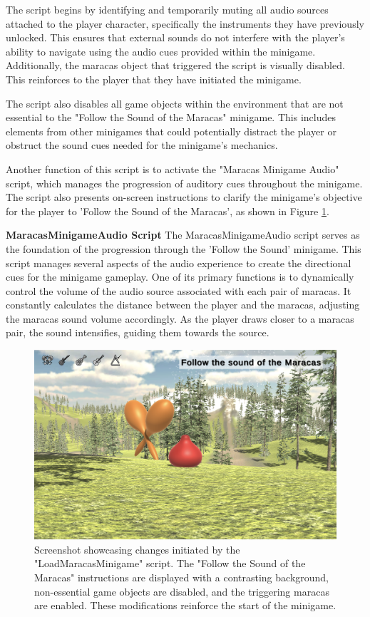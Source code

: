 \documentclass{l4proj}
\begin{document}
The script begins by identifying and temporarily muting all audio sources attached to the player character, specifically the instruments they have previously unlocked. This ensures that external sounds do not interfere with the player's ability to navigate using the audio cues provided within the minigame. Additionally, the maracas object that triggered the script is visually disabled. This  reinforces to the player that they have initiated the minigame.

The script also disables all game objects within the environment that are not essential to the "Follow the Sound of the Maracas" minigame. This includes elements from other minigames that could potentially distract the player or obstruct the sound cues needed for the minigame's mechanics.

Another function of this script is to activate the "Maracas Minigame Audio" script, which manages the progression of auditory cues throughout the minigame. The script also presents on-screen instructions to clarify the minigame's objective for the player to 'Follow the Sound of the Maracas', as shown in Figure \ref{fig:maracas_setup}.
\newline

\textbf{MaracasMinigameAudio Script} \newline
The MaracasMinigameAudio script serves as the foundation of the progression through the 'Follow the Sound' minigame. This script manages several aspects of the audio experience to create the directional cues for the minigame gameplay. One of its primary functions is to dynamically control the volume of the audio source associated with each pair of maracas. It constantly calculates the distance between the player and the maracas, adjusting the maracas sound volume accordingly. As the player draws closer to a maracas pair, the sound intensifies, guiding them towards the source.

\begin{figure}[h]
 \centering
 \includegraphics[width=0.7\linewidth]{dissertation/images/Maracas_Setup.png} 
 \caption{Screenshot showcasing changes initiated by the "LoadMaracasMinigame" script. The "Follow the Sound of the Maracas" instructions are displayed with a contrasting background, non-essential game objects are disabled, and the triggering maracas are enabled. These modifications reinforce the start of the minigame.} 
 \label{fig:maracas_setup} 
\end{figure}
\end{document}
